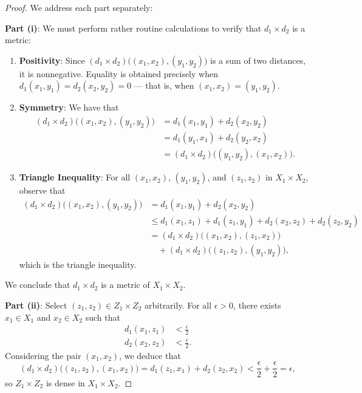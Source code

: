 \documentclass[11pt]{article}
\begin{document}
\begin{proof}
  We address each part separately:

  \textbf{Part (i)}: We must perform rather routine calculations to verify that $d_{1} \times d_{2}$ is a metric:
  \begin{enumerate}
    \item \textbf{Positivity}: Since $(d_{1} \times d_{2}) \big( (x_{1}, x_{2}), (y_{1}, y_{2}) \big)$ is a sum of two distances, it is nonnegative. Equality is obtained precisely when $d_{1}(x_{1}, y_{1}) = d_{2}(x_{2}, y_{2}) = 0$ --- that is, when $(x_{1}, x_{2}) = (y_{1}, y_{2})$.
    \item \textbf{Symmetry}: We have that
    \begin{align*}
      (d_{1} \times d_{2}) \big( (x_{1}, x_{2}), (y_{1}, y_{2}) \big) &= d_{1}(x_{1}, y_{1}) + d_{2}(x_{2}, y_{2}) \\
                                                                      &= d_{1}(y_{1}, x_{1}) + d_{2}(y_{2}, x_{2}) \\
                                                                      &= (d_{1} \times d_{2}) \big( (y_{1}, y_{2}), (x_{1}, x_{2}) \big).
    \end{align*}
    \item \textbf{Triangle Inequality}: For all $(x_{1}, x_{2})$, $(y_{1}, y_{2})$, and $(z_{1}, z_{2})$ in $X_{1} \times X_{2}$, observe that
    \begin{align*}
      (d_{1} \times d_{2}) \big( (x_{1}, x_{2}), (y_{1}, y_{2}) \big) &= d_{1}(x_{1}, y_{1}) + d_{2}(x_{2}, y_{2}) \\
                                                                      &\le d_{1}(x_{1}, z_{1}) + d_{1}(z_{1}, y_{1}) + d_{2}(x_{2}, z_{2}) + d_{2}(z_{2}, y_{2}) \\
                                                                      &= (d_{1} \times d_{2}) \big( (x_{1}, x_{2}), (z_{1}, x_{2}) \big) \\
                                                                      & \quad + (d_{1} \times d_{2}) \big( (z_{1}, z_{2}), (y_{1}, y_{2}) \big),
    \end{align*}
    which is the triangle inequality.
  \end{enumerate}
  We conclude that $d_{1} \times d_{2}$ is a metric of $X_{1} \times X_{2}$.

  \newpage

  \textbf{Part (ii)}: Select $(z_{1}, z_{2}) \in Z_{1} \times Z_{2}$ arbitrarily. For all $\epsilon > 0$, there exists $x_{1} \in X_{1}$ and $x_{2} \in X_{2}$ such that
  \begin{align*}
    d_{1}(x_{1}, z_{1}) &< \frac{\epsilon}{2} \\
    d_{2}(x_{2}, z_{2}) &< \frac{\epsilon}{2}.
  \end{align*}
  Considering the pair $(x_{1}, x_{2})$, we deduce that
  \[
    (d_{1} \times d_{2}) \big( (z_{1}, z_{2}), (x_{1}, x_{2}) \big) = d_{1}(z_{1}, x_{1}) + d_{2}(z_{2}, x_{2}) < \frac{\epsilon}{2} + \frac{\epsilon}{2} = \epsilon,
  \]
  so $Z_{1} \times Z_{2}$ is dense in $X_{1} \times X_{2}$.


\end{proof}
\end{document}
